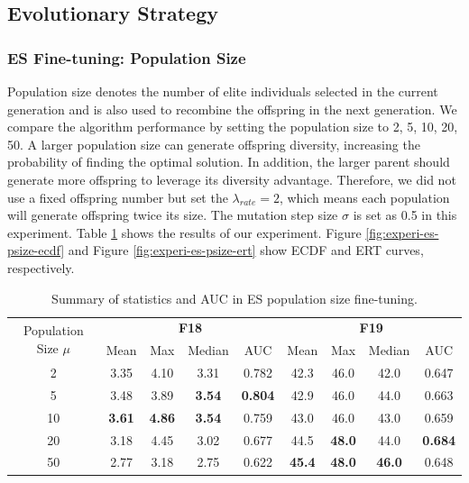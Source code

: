\documentclass{article}
\begin{document}
\subsection{Evolutionary Strategy}

\subsubsection{ES Fine-tuning: Population Size}

Population size denotes the number of elite individuals selected in the current generation and is also used to recombine the offspring in the next generation. We compare the algorithm performance by setting the population size to 2, 5, 10, 20, 50.  A larger population size can generate offspring diversity, increasing the probability of finding the optimal solution. In addition, the larger parent should generate more offspring to leverage its diversity advantage. Therefore, we did not use a fixed offspring number but set the $\lambda_{rate} = 2$, which means each population will generate offspring twice its size. The mutation step size $\sigma$ is set as 0.5 in this experiment. Table \ref{tab:experi-es-psize} shows the results of our experiment. Figure \ref{fig:experi-es-psize-ecdf} and Figure \ref{fig:experi-es-psize-ert} show ECDF and ERT curves, respectively.

\begin{table}[!ht]
    \centering
    \caption{Summary of statistics and AUC in ES population size fine-tuning.}
    \label{tab:experi-es-psize}
    \begin{tabular}{ccccccccc}
        \toprule
        \multirow{2}[3]{*}{Population Size $\mu$} &
        \multicolumn{4}{c}{\textbf{F18}} &
        \multicolumn{4}{c}{\textbf{F19}}\\
        \cmidrule(lr){2-5}
        \cmidrule(lr){6-9}
        & Mean & Max & Median & AUC & Mean & Max & Median & AUC\\
        \midrule
        2   & 3.35 & 4.10 & 3.31 & 0.782 & 42.3  & 46.0 & 42.0 & 0.647\\
        5   & 3.48 & 3.89 & \textbf{3.54} & \textbf{0.804} & 42.9  & 46.0 & 44.0 & 0.663\\
        10  & \textbf{3.61} & \textbf{4.86} & \textbf{3.54} & 0.759 & 43.0 & 46.0 & 43.0 & 0.659\\
        20  & 3.18 & 4.45 & 3.02 & 0.677 & 44.5  & \textbf{48.0} & 44.0 & \textbf{0.684}\\
        50  & 2.77 & 3.18 & 2.75 & 0.622 & \textbf{45.4 } & \textbf{48.0} & \textbf{46.0} & 0.648\\
        \bottomrule
    \end{tabular}
\end{table}
\end{document}
